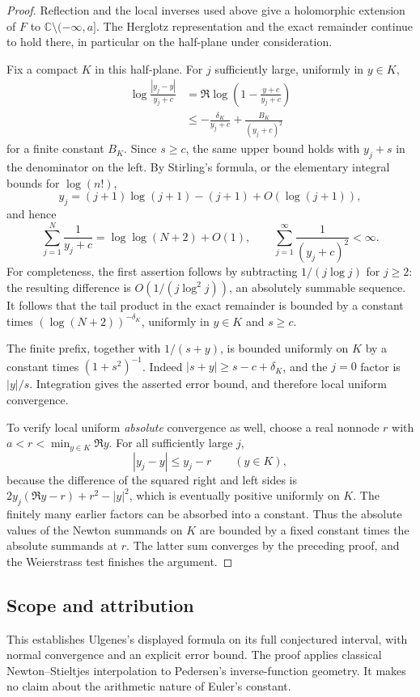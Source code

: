 \documentclass[11pt,a4paper]{article}
\theoremstyle{definition}
\theoremstyle{remark}
\numberwithin{equation}{section}
\begin{document}
\begin{proof}
Reflection and the local inverses used above give a holomorphic
extension of $F$ to $\mathbb C\setminus(-\infty,a]$.
The Herglotz representation and the exact remainder continue to hold
there, in particular on the half-plane under consideration.

Fix a compact $K$ in this half-plane. For $j$ sufficiently large,
uniformly in $y\in K$,
\begin{align*}
 \log\frac{|y_j-y|}{y_j+c}
 &=\Re\log\left(1-\frac{y+c}{y_j+c}\right)\\
 &\leq-\frac{\delta_K}{y_j+c}
       +\frac{B_K}{(y_j+c)^2}
\end{align*}
for a finite constant $B_K$. Since $s\geq c$, the same upper bound
holds with $y_j+s$ in the denominator on the left.
By Stirling's formula, or the elementary integral bounds for
$\log(n!)$,
\[
 y_j=(j+1)\log(j+1)-(j+1)+O(\log(j+1)),
\]
and hence
\[
 \sum_{j=1}^{N}\frac1{y_j+c}=\log\log(N+2)+O(1),
 \qquad
 \sum_{j=1}^{\infty}\frac1{(y_j+c)^2}<\infty.
\]
For completeness, the first assertion follows by subtracting
$1/(j\log j)$ for $j\geq2$: the resulting difference is
$O(1/(j\log^2j))$, an absolutely summable sequence.
It follows that the tail product in the exact remainder is bounded
by a constant times $(\log(N+2))^{-\delta_K}$, uniformly in
$y\in K$ and $s\geq c$.

The finite prefix, together with $1/(s+y)$, is bounded uniformly on
$K$ by a constant times $(1+s^2)^{-1}$. Indeed
$|s+y|\geq s-c+\delta_K$, and the $j=0$ factor is $|y|/s$.
Integration gives the asserted error bound, and therefore local
uniform convergence.

To verify local uniform \emph{absolute} convergence as well, choose a
real nonnode $r$ with $a<r<\min_{y\in K}\Re y$.
For all sufficiently large $j$,
\[
 |y_j-y|\leq y_j-r\qquad(y\in K),
\]
because the difference of the squared right and left sides is
$2y_j(\Re y-r)+r^2-|y|^2$, which is eventually positive uniformly
on $K$. The finitely many earlier factors can be absorbed into a
constant. Thus the absolute values of the Newton summands on $K$
are bounded by a fixed constant times the absolute summands at $r$.
The latter sum converges by the preceding proof, and the Weierstrass
test finishes the argument.
\end{proof}

\subsection{Scope and attribution}
This establishes Ulgenes's displayed formula on its full conjectured
interval, with normal convergence and an explicit error bound. The
proof applies classical Newton--Stieltjes interpolation to Pedersen's
inverse-function geometry. It makes no claim about the arithmetic
nature of Euler's constant.
\end{document}
